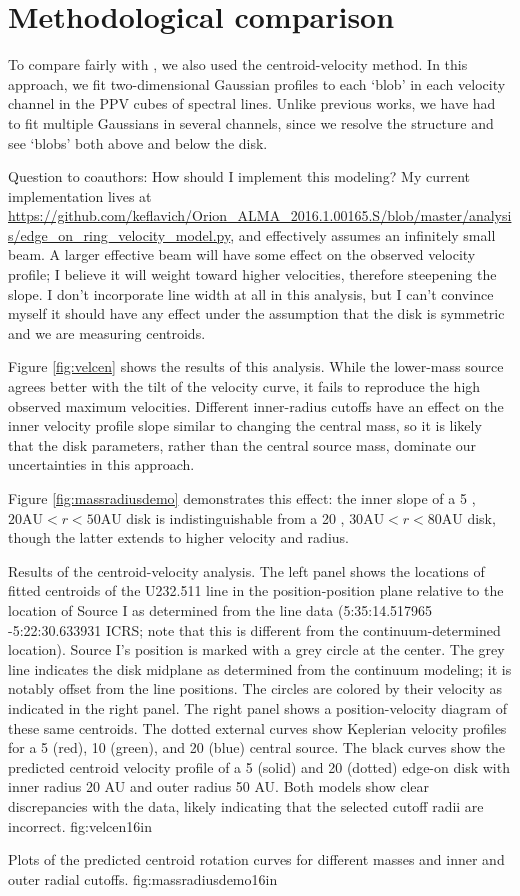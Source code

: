 \documentclass[twocolumn]{aastex61}
\begin{document}
\section{Methodological comparison}
To compare fairly with \citet{Plambeck2016a}, we also used the
centroid-velocity method.  In this approach, we fit two-dimensional Gaussian
profiles to each `blob' in each velocity channel in the PPV cubes of spectral
lines.  Unlike previous works, we have had to fit multiple Gaussians in several
channels, since we resolve the structure and see `blobs' both above and below
the disk.

{\color{red} Question to coauthors: How should I implement this modeling?
My current implementation lives at
\url{https://github.com/keflavich/Orion_ALMA_2016.1.00165.S/blob/master/analysis/edge_on_ring_velocity_model.py},
and effectively assumes an infinitely small beam.  A larger effective beam will
have some effect on the observed velocity profile; I believe it will weight
toward higher velocities, therefore steepening the slope.  I don't incorporate
line width at all in this analysis, but I can't convince myself it should have
any effect under the assumption that the disk is symmetric and we are measuring
centroids.}

Figure \ref{fig:velcen} shows the results of this analysis.  While the
lower-mass source agrees better with the tilt of the velocity curve, it fails
to reproduce the high observed maximum velocities.  Different inner-radius
cutoffs have an effect on the inner velocity profile slope similar to changing
the central mass, so it is likely that the disk parameters, rather than the
central source mass, dominate our uncertainties in this approach. 

Figure \ref{fig:massradiusdemo} demonstrates this effect: the inner slope of
a 5 \msun, $20 \mathrm{AU} < r < 50 \mathrm{AU}$ disk is indistinguishable
from a 20 \msun , $30 \mathrm{AU} < r < 80 \mathrm{AU}$ disk, though the latter
extends to higher velocity and radius.

{Results of the centroid-velocity analysis.
The left panel shows the locations of fitted centroids of the U232.511 line in
the position-position plane relative to the location of Source I as determined
from the line data (5:35:14.517965 -5:22:30.633931 ICRS; note that this is
different from the continuum-determined location).  Source I's position is
marked with a grey circle at the center.  The grey line indicates the disk
midplane as determined from the continuum modeling; it is notably offset from
the line positions.  The circles are colored by their velocity as indicated in
the right panel.  The right panel shows a position-velocity diagram of these
same centroids.  The dotted external curves show Keplerian velocity profiles
for a 5 (red), 10 (green), and 20 (blue) \msun central source.  The black
curves show the predicted centroid velocity profile of a 5 \msun (solid) and 20
\msun (dotted) edge-on disk with inner radius 20 AU and outer radius 50 AU.
Both models show clear discrepancies with the data, likely indicating that
the selected cutoff radii are incorrect.
}
{fig:velcen}{1}{6in}

{Plots of the predicted centroid rotation curves for different masses
and inner and outer radial cutoffs.}
{fig:massradiusdemo}{1}{6in}
\end{document}
